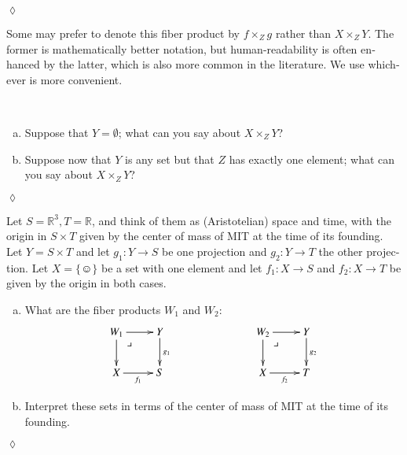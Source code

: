 \documentclass{book}
\makeatletter
\def\RR{{\mathbb R}}
\def\singleton{\{\smiley\}}
\def\to{\rightarrow}
\def\taking{\colon}
\def\ullimit{\ar@{}[rd]|(.3)*+{\lrcorner}}
\theoremstyle{theoremENG}
\theoremstyle{lemmaENG}
\theoremstyle{propositionENG}
\theoremstyle{corollaryENG}
\theoremstyle{factENG}
\theoremstyle{remarkENG}
\newtheorem{remarkENG}[subsubsection]{\begin{english}Remark\end{english}}
\theoremstyle{exampleENG}
\theoremstyle{warningENG}
\theoremstyle{questionENG}
\theoremstyle{guessENG}
\theoremstyle{answerENG}
\theoremstyle{constructionENG}
\theoremstyle{rulesENG}
\theoremstyle{excENG}
\newtheorem{excENG}[subsubsection]{\begin{english}Exercise\end{english}}
\theoremstyle{appENG}
\theoremstyle{definitionENG}
\theoremstyle{notationENG}
\theoremstyle{conjectureENG}
\theoremstyle{postulateENG}
\newenvironment{exerciseENG}{\begin{excENG}}{\hspace*{\fill}$\lozenge$\end{excENG}}
\theoremstyle{theoremRUS}
\theoremstyle{lemmaRUS}
\theoremstyle{propositionRUS}
\theoremstyle{corollaryRUS}
\theoremstyle{factRUS}
\theoremstyle{remarkRUS}
\theoremstyle{exampleRUS}
\theoremstyle{warningRUS}
\theoremstyle{questionRUS}
\theoremstyle{guessRUS}
\theoremstyle{answerRUS}
\theoremstyle{constructionRUS}
\theoremstyle{rulesRUS}
\theoremstyle{excRUS}
\theoremstyle{appRUS}
\theoremstyle{definitionRUS}
\theoremstyle{notationRUS}
\theoremstyle{conjectureRUS}
\theoremstyle{postulateRUS}
\def\sexc{\begin{enumerate}[a.)]\setlength{\itemsep}{.1cm}\setlength{\parskip}{.1cm}\item}
\def\next{\item}
\def\endsexc{\end{enumerate}}
\makeatother
\begin{document}
\begin{english}
\begin{exerciseENG}
\begin{russian} \end{russian}

\end{exerciseENG}

\begin{remarkENG}

Some may prefer to denote this fiber product by $f\times_Zg$ rather than $X\times_ZY$. The former is  mathematically better notation, but human-readability is often enhanced by the latter, which is also more common in the literature. We use whichever is more convenient.

\begin{russian} \end{russian}

\end{remarkENG}

\begin{exerciseENG}~

\sexc Suppose that $Y=\emptyset$; what can you say about $X\times_ZY$? 
\next Suppose now that $Y$ is any set but that $Z$ has exactly one element; what can you say about $X\times_ZY$?
\endsexc

\begin{russian} \end{russian}

\end{exerciseENG}

\begin{exerciseENG}

Let $S=\RR^3, T=\RR$, and think of them as (Aristotelian) space and time, with the origin in $S\times T$ given by the center of mass of MIT at the time of its founding. Let $Y=S\times T$ and let $g_1\taking Y\to S$ be one projection and $g_2\taking Y\to T$ the other projection. Let $X=\singleton$ be a set with one element and let $f_1\taking X\to S$ and $f_2\taking X\to T$ be given by the origin in both cases. 
\sexc What are the fiber products $W_1$ and $W_2$:
$$
\xymatrix{W_1\ar[r]\ar[d]\ullimit&Y\ar[d]^{g_1}\\X\ar[r]_{f_1}&S}\hspace{1in}
\xymatrix{W_2\ar[r]\ar[d]\ullimit&Y\ar[d]^{g_2}\\X\ar[r]_{f_2}&T}
$$
\next Interpret these sets in terms of the center of mass of MIT at the time of its founding.
\endsexc

\begin{russian} \end{russian}


\end{exerciseENG}
\end{english}
\end{document}
